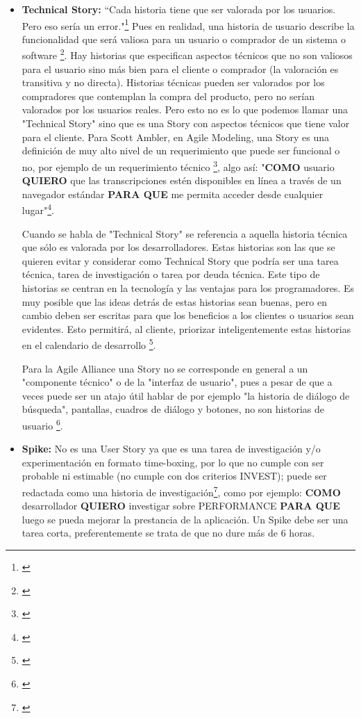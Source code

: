 \begin{itemize}

\item \textbf{Technical Story:}
“Cada historia tiene que ser valorada por los usuarios. Pero eso sería un error."\footnote{\cite{Cohn-2004}} Pues en realidad, una historia de usuario describe la funcionalidad que será valiosa para un usuario o comprador de un sistema o software \footnote{\cite{Cohn-2004}}. Hay historias que especifican aspectos técnicos que no son valiosos para el usuario sino más bien para el cliente o comprador (la valoración es transitiva y no directa). Historias técnicas pueden ser valorados por los compradores que contemplan la compra del producto, pero no serían valorados por los usuarios reales. Pero esto no es lo que podemos llamar una "Technical Story" sino que es una Story con aspectos técnicos que tiene valor para el cliente. Para Scott Ambler, en Agile Modeling, una Story es una definición de muy alto nivel de un requerimiento que puede ser funcional o no, por ejemplo de un requerimiento técnico \footnote{\cite{Scott-Ambler-2015}}, algo así: "\textbf{COMO} usuario \textbf{QUIERO} que las transcripciones estén disponibles en línea a través de un navegador estándar \textbf{PARA QUE} me permita acceder desde cualquier lugar"\footnote{\cite{Scott-Ambler-2015}}.

Cuando se habla de "Technical Story" se referencia a aquella historia técnica que sólo es valorada por los desarrolladores. Estas historias son las que se quieren evitar y considerar como Technical Story que podría ser una tarea técnica, tarea de investigación o tarea por deuda técnica. Este tipo de historias se centran en la tecnología y las ventajas para los programadores. Es muy posible que las ideas detrás de estas historias sean buenas, pero en cambio deben ser escritas para que los beneficios a los clientes o usuarios sean evidentes. Esto permitirá, al cliente, priorizar inteligentemente estas historias en el calendario de desarrollo \footnote{\cite{Cohn-2004}}.

Para la Agile Alliance una Story no se corresponde en general a un "componente técnico" o de la "interfaz de usuario", pues a pesar de que a veces puede ser un atajo útil hablar de por ejemplo "la historia de diálogo de búsqueda", pantallas, cuadros de diálogo y botones, no son historias de usuario \footnote{\cite{Scrum-Alliance-2015}}.

\item \textbf{Spike:}
No es una User Story ya que es una tarea de investigación y/o experimentación en formato time-boxing, por lo que no cumple con ser probable ni estimable (no cumple con dos criterios INVEST); puede ser redactada como una historia de investigación\footnote{\cite{Cohn-2004}}, como por ejemplo: \textbf{COMO} desarrollador \textbf{QUIERO} investigar sobre PERFORMANCE \textbf{PARA QUE} luego se pueda mejorar la prestancia de la aplicación. Un Spike debe ser una tarea corta, preferentemente se trata de que no dure más de 6 horas.\newline


\end{itemize}
